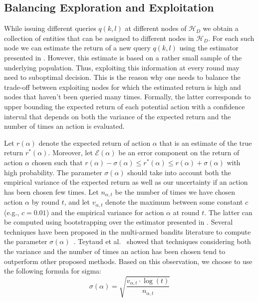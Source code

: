 \documentclass{vldb}
\newcommand{\hierarchy}{\mathcal{H}_D}
\begin{document}
\subsection{Balancing Exploration and Exploitation}
While issuing different queries $q(k,l)$ at different nodes of $\hierarchy$ we obtain a collection of entities that can be assigned to different nodes in $\hierarchy$. For each such node we can estimate the return of a new query $q(k,l)$ using the estimator presented in . However, this estimate is based on a rather small sample of the underlying population. Thus, exploiting this information at every round may need to suboptimal decision. This is the reason why one needs to balance the trade-off between exploiting nodes for which the estimated return is high and nodes that haven't been queried many times. Formally, the latter corresponds to upper bounding the expected return of each potential action with a confidence interval that depends on both the variance of the expected return and the number of times an action is evaluated.

Let $r(\alpha)$ denote the expected return of action $\alpha$ that is an estimate of the true return $r^*(\alpha)$. Moreover, let $\mathcal{E}(\alpha)$ be an error component on the return of action $\alpha$ chosen such that $r(\alpha) - \sigma(\alpha) \leq r^*(\alpha) \leq r(\alpha) + \sigma(\alpha)$ with high probability. The parameter $\sigma(\alpha)$ should take into account both the empirical variance of the expected return as well as our uncertainty if an action has been chosen few times. Let $n_{\alpha,t}$ be the number of times we have chosen action $\alpha$ by round $t$, and let $v_{\alpha,t}$ denote the maximum between some constant $c$ (e.g., $c = 0.01$) and the empirical variance for action $\alpha$ at round $t$. The latter can be computed using bootstrapping over the estimator presented in . Several techniques have been proposed in the multi-armed bandits literature to compute the parameter $\sigma(\alpha)$~\cite{teytaud:inria-00173263}. Teytaud et al.~\cite{teytaud:inria-00173263} showed that techniques considering both the variance and the number of times an action has been chosen tend to outperform other proposed methods. Based on this observation, we choose to use the following formula for sigma:
\begin{equation}
\sigma(\alpha) = \sqrt{\frac{v_{\alpha,t}\cdot\log(t)}{n_{\alpha,t}}}
\end{equation}
\end{document}

